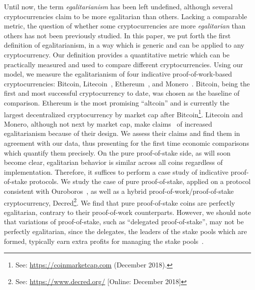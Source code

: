 Until now, the term \emph{egalitarianism} has been left undefined, although
several cryptocurrencies claim to be more egalitarian than others.
Lacking a comparable metric, the question of whether some cryptocurrencies are
more \emph{egalitarian} than others has not been previously studied. In this paper, we
put forth the first definition of egalitarianism, in a way which is
generic and can be applied to any cryptocurrency.
Our definition provides a quantitative metric which can be practically measured and used
to compare different cryptocurrencies.
Using our model, we measure the egalitarianism of
four indicative proof-of-work-based
cryptocurrencies: Bitcoin, Litecoin~\cite{lee2011litecoin}, Ethereum~\cite{wood2014ethereum}, and Monero~\cite{van2013cryptonote}. Bitcoin, being the first and most successful cryptocurrency to date, was chosen as
the baseline of comparison. Ethereum is the most promising ``altcoin'' and is currently the largest decentralized cryptocurrency by market cap after Bitcoin\footnote{See: \url{https://coinmarketcap.com} (December 2018).}.
Litecoin and Monero, although not next by market cap,
make claims~\cite{van2013cryptonote,mcmillan2013} of increased egalitarianism because of their design.
We assess their claims and find them in agreement with our data, thus presenting for the first time economic comparisons which quantify them precisely.
On the pure proof-of-stake side, as will soon become clear, egalitarian
behavior is similar across all coins regardless of implementation. Therefore,
it suffices to perform a case study of indicative proof-of-stake protocols.
We study the case of pure proof-of-stake, applied on a protocol consistent with Ouroboros~\cite{C:KRDO17},
as well as a hybrid proof-of-work/proof-of-stake cryptocurrency,
Decred\footnote{See: \url{https://www.decred.org/} [Online: December 2018]}. We find that pure proof-of-stake coins are perfectly
egalitarian, contrary to their proof-of-work counterparts. However, we should
note that variations of proof-of-stake, such as ``delegated proof-of-stake'',
may not be perfectly egalitarian, since the delegates, \ie the leaders of
the stake pools which are formed, typically earn extra profits for managing the
stake pools~\cite{stouka-koutsoupias-kiayias}.


